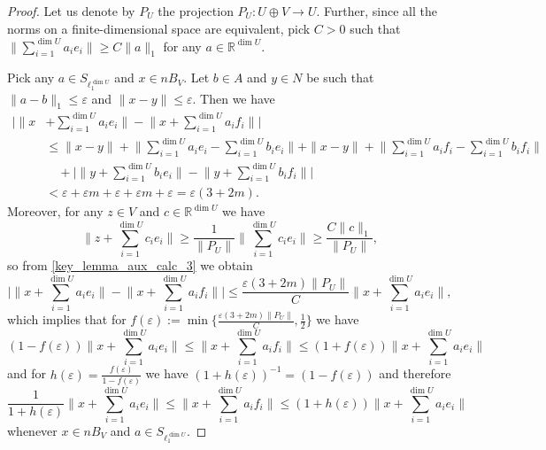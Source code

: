 \documentclass[11pt]{amsart}
\theoremstyle{definition}
\theoremstyle{remark}
\newcommand{\Rea}{\mathbb R}
\begin{document}
\begin{proof}Let us denote by $P_U$ the projection $P_U:U\oplus V\to U$. Further, since all the norms on a finite-dimensional space are equivalent, pick $C>0$ such that $\|\sum_{i=1}^{\dim U} a_ie_i\|\geq C\|a\|_1$ for any $a\in\Rea^{\dim U}$.

Pick any $a\in S_{\ell_1^{\dim U}}$ and $x\in nB_V$. Let $b\in A$ and $y\in N$ be such that $\|a-b\|_1\leq \varepsilon$ and $\|x-y\|\leq \varepsilon$. Then we have
	\begin{equation} \label{key_lemma_aux_calc_3}
		\begin{split} 
			\Bigg| \Big\| x & + \sum_{i=1}^{\dim U} a_i e_i \Big\| - \Big\| x + \sum_{i=1}^{\dim U} a_i f_i \Big\| \Bigg| \\
			& \leq \| x - y \| + \Big\| \sum_{i=1}^{\dim U} a_i e_i - \sum_{i=1}^{\dim U} b_i e_i \Big\| + \|x-y\|  + \Big\| \sum_{i=1}^{\dim U} a_i f_i - \sum_{i=1}^{\dim U} b_i f_i \Big\| \\
			& \quad + \Bigg| \Big\| y + \sum_{i=1}^{\dim U} b_i e_i \Big\| - \Big\| y + \sum_{i=1}^{\dim U} b_i f_i \Big\| \Bigg| \\
			& < \varepsilon + \varepsilon m + \varepsilon + \varepsilon m + \varepsilon = \varepsilon(3 + 2m).
		\end{split}
	\end{equation}
Moreover, for any $z\in V$ and $c\in \Rea^{\dim U}$ we have
\[
    \Big\|z + \sum_{i=1}^{\dim U}c_i e_i\Big\| \geq \frac{1}{\|P_U\|}\Big\|\sum_{i=1}^{\dim U}c_i e_i\Big\|\geq \frac{C\|c\|_1}{\|P_U\|},
\]
so from \eqref{key_lemma_aux_calc_3} we obtain
\[
    \Bigg| \Big\| x + \sum_{i=1}^{\dim U} a_i e_i \Big\| - \Big\| x + \sum_{i=1}^{\dim U} a_i f_i \Big\| \Bigg|\leq \frac{\varepsilon(3+2m)\|P_U\|}{C}\Big\| x + \sum_{i=1}^{\dim U} a_i e_i \Big\|,
\]
which implies that for $f(\varepsilon):=\min\{\frac{\varepsilon(3+2m)\|P_U\|}{C},\tfrac{1}{2}\}$ we have
\begin{equation}
    (1-f(\varepsilon))\Big\| x + \sum_{i=1}^{\dim U} a_i e_i \Big\|\leq \Big\| x + \sum_{i=1}^{\dim U} a_i f_i \Big\|\leq (1+f(\varepsilon))\Big\| x + \sum_{i=1}^{\dim U} a_i e_i \Big\|
\end{equation}
and for $h(\varepsilon) = \tfrac{f(\varepsilon)}{1-f(\varepsilon)}$ we have $(1+h(\varepsilon))^{-1} = (1-f(\varepsilon))$ and therefore
\begin{equation}\label{key_lemma_final_ineq}
    \frac{1}{1+h(\varepsilon)}\Big\| x + \sum_{i=1}^{\dim U} a_i e_i \Big\|\leq \Big\| x + \sum_{i=1}^{\dim U} a_i f_i \Big\|\leq (1+h(\varepsilon))\Big\| x + \sum_{i=1}^{\dim U} a_i e_i \Big\|
\end{equation}
whenever $x\in nB_V$ and $a\in S_{\ell_1^{\dim U}}$.


\end{proof}
\end{document}
